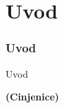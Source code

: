 %

\section{Uvod}
\begin{frame}[fragile]
	\frametitle{Uvod}

	\begin{center}\huge{Uvod}\end{center}
	\begin{center}\huge{\color{typo3darkgrey}\textbf{(Cinjenice)}}\end{center}

\end{frame}


